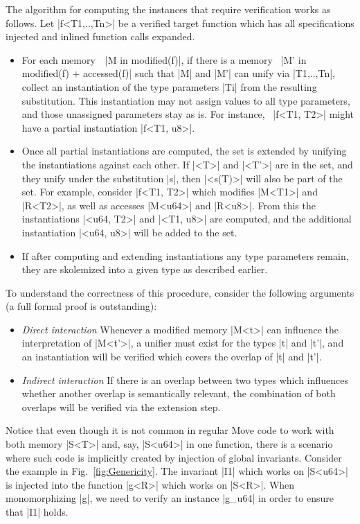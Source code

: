 The algorithm for computing the instances that require verification works as
follows. Let |f<T1,..,Tn>| be a verified target function which has all
specifications injected and inlined function calls expanded.
\begin{itemize}
\item For each memory~~|M in modified(f)|, if there is a memory~%
  |M' in modified(f) + accessed(f)| such that |M| and |M'| can unify via
  |T1,..,Tn|, collect an instantiation of the type parameters |Ti| from the
  resulting substitution. This instantiation may not assign values to all type
  parameters, and those unassigned parameters stay as is. For instance,~%
  |f<T1, T2>| might have a partial instantiation |f<T1, u8>|.
\item Once all partial instantiations are computed, the set is
  extended by unifying the instantiations against each other. If |<T>| and
  |<T'>| are in the set, and they unify under the substitution |s|, then
  |<s(T)>| will also be part of the set.  For example, consider |f<T1, T2>|
  which modifies |M<T1>| and |R<T2>|, as well as accesses |M<u64>| and
  |R<u8>|. From this the instantiations |<u64, T2>| and |<T1, u8>| are computed,
  and the additional instantiation |<u64, u8>| will be added to the set.
\item If after computing and extending instantiations any type parameters
  remain, they are skolemized into a given type as described earlier.
\end{itemize}

\noindent To understand the correctness of this procedure, consider the
following arguments (a full formal proof is outstanding):

\begin{itemize}
\item \emph{Direct interaction} Whenever a modified memory |M<t>| can influence
  the interpretation of |M<t'>|, a unifier must exist for the types |t| and |t'|,
  and an instantiation will be verified which covers the overlap of |t| and
  |t'|.
\item \emph{Indirect interaction} If there is an overlap between two types
  which influences whether another overlap is semantically relevant, the
  combination of both overlaps will be verified via the extension step.
\end{itemize}

Notice that even though it is not common in regular Move code to work with both
memory |S<T>| and, say, |S<u64>| in one function, there is a scenario where such
code is implicitly created by injection of global invariants. Consider the
example in Fig.~\ref{fig:Genericity}. The invariant |I1| which works on |S<u64>|
is injected into the function |g<R>| which works on |S<R>|. When monomorphizing
|g|, we need to verify an instance |g_u64| in order to ensure that |I1| holds.



